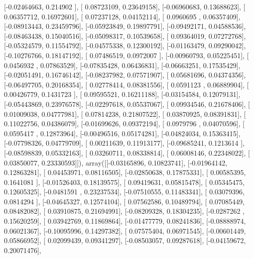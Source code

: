 \documentclass{article}
\begin{document}
       [-0.02464663,  0.214902  ],
       [ 0.08723109,  0.23649158],
       [-0.06960683,  0.13688623],
       [ 0.06357712,  0.16972601],
       [ 0.07237128,  0.04152114],
       [ 0.0960695 ,  0.06357409],
       [-0.08913443,  0.23459796],
       [-0.05923849,  0.19897791],
       [-0.09492171,  0.04588536],
       [-0.08463438,  0.15040516],
       [-0.05098317,  0.10539658],
       [ 0.09364019,  0.07272768],
       [-0.05324579,  0.11554792],
       [-0.04575338,  0.12300192],
       [-0.01163479,  0.09290042],
       [-0.10276766,  0.18147192],
       [ 0.07486519,  0.0972007 ],
       [-0.00960793,  0.05225451],
       [ 0.0456932 ,  0.07863529],
       [-0.07835428,  0.06436831],
       [-0.06663251,  0.17535429],
       [-0.02051491,  0.16746142],
       [-0.08237982,  0.07571907],
       [ 0.05681696,  0.04374356],
       [-0.06497705,  0.20168354],
       [ 0.02778414,  0.08381556],
       [ 0.0591123 ,  0.06889904],
       [ 0.00426779,  0.1431723 ],
       [ 0.09595521,  0.16211188],
       [-0.03154584,  0.12079131],
       [-0.05443869,  0.23976578],
       [-0.02297618,  0.05537067],
       [ 0.09934546,  0.21678406],
       [ 0.01009038,  0.04777981],
       [ 0.07814238,  0.21807522],
       [ 0.03870925,  0.08391831],
       [ 0.11022756,  0.04386079],
       [-0.01699626,  0.09372194],
       [ 0.0979796 ,  0.04070596],
       [ 0.0595417 ,  0.12873964],
       [-0.00496516,  0.05174281],
       [-0.04824034,  0.15363415],
       [-0.07798326,  0.04779709],
       [ 0.00211639,  0.11913177],
       [-0.09685241,  0.1213614 ],
       [-0.08598839,  0.05332163],
       [ 0.03260711,  0.08338814],
       [ 0.06008146,  0.22348022],
       [ 0.03850077,  0.23330593]]), array([[-0.03165896,  0.10823741],
       [-0.01964142,  0.12863281],
       [ 0.04453971,  0.08116505],
       [-0.02850638,  0.17875331],
       [ 0.00585395,  0.1641081 ],
       [-0.01526403,  0.18139575],
       [ 0.09419631,  0.05815478],
       [ 0.05345475,  0.12605325],
       [-0.0481591 ,  0.23237534],
       [-0.07510555,  0.11483341],
       [ 0.03079396,  0.0814294 ],
       [-0.04645327,  0.12574104],
       [ 0.07562586,  0.10489794],
       [ 0.07085449,  0.08482082],
       [ 0.03910875,  0.21694991],
       [-0.08209328,  0.18304235],
       [-0.0287262 ,  0.15620259],
       [ 0.03942769,  0.11869864],
       [-0.01477779,  0.08241836],
       [-0.08888974,  0.06021367],
       [-0.10095996,  0.14297382],
       [ 0.07575404,  0.06971545],
       [-0.00601449,  0.05866952],
       [ 0.02099439,  0.09341297],
       [-0.08503057,  0.09287618],
       [-0.04159672,  0.20071476],
\end{document}
